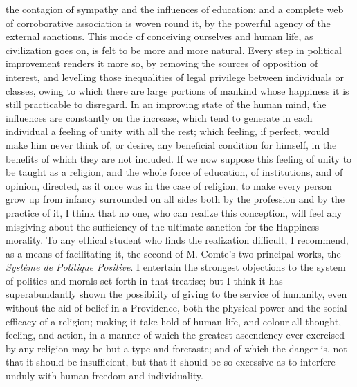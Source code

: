 \documentclass[12pt]{report}
\begin{document}
the contagion of sympathy and the influences of education; and a complete web of corroborative association is woven round it, by the powerful agency of the external sanctions. This mode of conceiving ourselves and human life, as civilization goes on, is felt to be more and more natural. Every step in political improvement renders it more so, by removing the sources of opposition of interest, and levelling those inequalities of legal privilege between individuals or classes, owing to which there are large portions of mankind whose happiness it is still practicable to disregard. In an improving state of the human mind, the influences are constantly on the increase, which tend to generate in each individual a feeling of unity with all the rest; which feeling, if perfect, would make him never think of, or desire, any beneficial condition for himself, in the benefits of which they are not included. If we now suppose this feeling of unity to be taught as a religion, and the whole force of education, of institutions, and of opinion, directed, as it once was in the case of religion, to make every person grow up from infancy surrounded on all sides both by the profession and by the practice of it, I think that no one, who can realize this conception, will feel any misgiving about the sufficiency of the ultimate sanction for the Happiness morality. To any ethical student who finds the realization difficult, I recommend, as a means of facilitating it, the second of M. Comte's two principal works, the \emph{Système de Politique Positive}. I entertain the strongest objections to the system of politics and morals set forth in that treatise; but I think it has superabundantly shown the possibility of giving to the service of humanity, even without the aid of belief in a Providence, both the physical power and the social efficacy of a religion; making it take hold of human life, and colour all thought, feeling, and action, in a manner of which the greatest ascendency ever exercised by any religion may be but a type and foretaste; and of which the danger is, not that it should be insufficient, but that it should be so excessive as to interfere unduly with human freedom and individuality.
\end{document}
